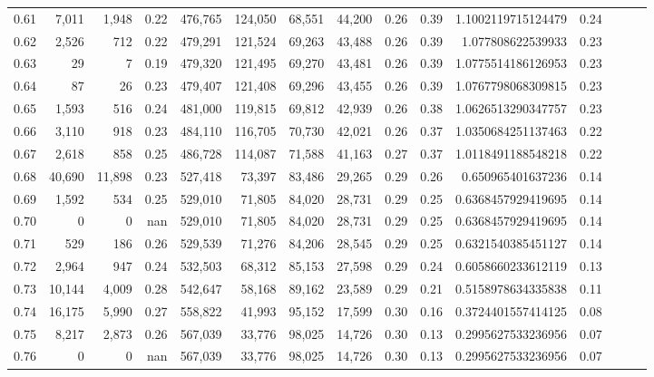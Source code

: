 \begin{tabular}{rrrrrrrrrrrrrrr}
0.61 &   7,011 &   1,948 &  0.22 &  476,765 &  124,050 &   68,551 &   44,200 &  0.26 &  0.39 &   1.1002119715124479 &      0.24 \\
0.62 &   2,526 &     712 &  0.22 &  479,291 &  121,524 &   69,263 &   43,488 &  0.26 &  0.39 &    1.077808622539933 &      0.23 \\
0.63 &      29 &       7 &  0.19 &  479,320 &  121,495 &   69,270 &   43,481 &  0.26 &  0.39 &   1.0775514186126953 &      0.23 \\
0.64 &      87 &      26 &  0.23 &  479,407 &  121,408 &   69,296 &   43,455 &  0.26 &  0.39 &   1.0767798068309815 &      0.23 \\
0.65 &   1,593 &     516 &  0.24 &  481,000 &  119,815 &   69,812 &   42,939 &  0.26 &  0.38 &   1.0626513290347757 &      0.23 \\
0.66 &   3,110 &     918 &  0.23 &  484,110 &  116,705 &   70,730 &   42,021 &  0.26 &  0.37 &   1.0350684251137463 &      0.22 \\
0.67 &   2,618 &     858 &  0.25 &  486,728 &  114,087 &   71,588 &   41,163 &  0.27 &  0.37 &   1.0118491188548218 &      0.22 \\
0.68 &  40,690 &  11,898 &  0.23 &  527,418 &   73,397 &   83,486 &   29,265 &  0.29 &  0.26 &    0.650965401637236 &      0.14 \\
0.69 &   1,592 &     534 &  0.25 &  529,010 &   71,805 &   84,020 &   28,731 &  0.29 &  0.25 &   0.6368457929419695 &      0.14 \\
0.70 &       0 &       0 &   nan &  529,010 &   71,805 &   84,020 &   28,731 &  0.29 &  0.25 &   0.6368457929419695 &      0.14 \\
0.71 &     529 &     186 &  0.26 &  529,539 &   71,276 &   84,206 &   28,545 &  0.29 &  0.25 &   0.6321540385451127 &      0.14 \\
0.72 &   2,964 &     947 &  0.24 &  532,503 &   68,312 &   85,153 &   27,598 &  0.29 &  0.24 &   0.6058660233612119 &      0.13 \\
0.73 &  10,144 &   4,009 &  0.28 &  542,647 &   58,168 &   89,162 &   23,589 &  0.29 &  0.21 &   0.5158978634335838 &      0.11 \\
0.74 &  16,175 &   5,990 &  0.27 &  558,822 &   41,993 &   95,152 &   17,599 &  0.30 &  0.16 &   0.3724401557414125 &      0.08 \\
0.75 &   8,217 &   2,873 &  0.26 &  567,039 &   33,776 &   98,025 &   14,726 &  0.30 &  0.13 &   0.2995627533236956 &      0.07 \\
0.76 &       0 &       0 &   nan &  567,039 &   33,776 &   98,025 &   14,726 &  0.30 &  0.13 &   0.2995627533236956 &      0.07 \\

\end{tabular}
